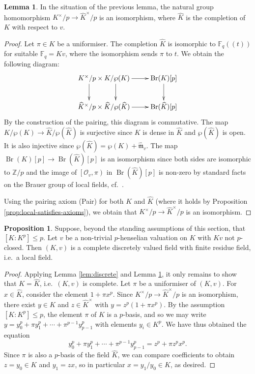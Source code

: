 \documentclass[a4paper, british, oneside]{amsart}
\newcommand{\Z}{\mathbb{Z}}
\newcommand{\F}{\mathbb{F}}
\DeclareMathOperator{\Br}{Br}
\newcommand{\pow}[1]{(\!(#1)\!)}
\newcommand{\pair}[2]{\left[{#1}, {#2}\right)}
\theoremstyle{definition}
\newtheorem{lemma}[theorem]{Lemma}
\newtheorem{proposition}[theorem]{Proposition}
\theoremstyle{remark}
\begin{document}
\begin{lemma}\label{lem:p-th-power-classes-isom}
  In the situation of the previous lemma,
  the natural group homomorphism $K^\times/p \to \widehat{K}^\times/p$ is an isomorphism,
  where $\widehat{K}$ is the completion of $K$ with respect to $v$.
\end{lemma}
\begin{proof}
  Let $\pi \in K$ be a uniformiser.
  The completion $\widehat{K}$ is isomorphic to $\F_q\pow{t}$ for suitable $\F_q = Kv$,
  where the isomorphism sends $\pi$ to $t$.
  We obtain the following diagram:
  \[ \xymatrix{
      K^\times/p  \times K/\wp(K) \ar@<-5ex>[d] \ar@<4ex>[d] \ar[r] & \Br(K)[p] \ar[d] \\
      \widehat{K}^\times/p \times \widehat{K}/\wp(\widehat{K}) \ar[r] & \Br(\widehat{K})[p]
    }\]
  By the construction of the pairing, this diagram is commutative.
  The map $K/\wp(K) \to \widehat{K}/\wp(\widehat{K})$ is surjective since $K$ is dense in $\widehat{K}$ and $\wp(\widehat{K})$ is open.
  It is also injective since $\wp(\widehat{K}) = \wp(K) + \widehat{\mathfrak{m}}_v$.
  The map $\Br(K)[p] \to \Br(\widehat{K})[p]$ is an isomorphism
  since both sides are isomorphic to $\Z/p$
  and the image of $\pair{\mathcal{O}_v}{\pi}$ in $\Br(\widehat{K})[p]$ is non-zero
  by standard facts on the Brauer group of local fields, cf.\ \cite[Remark 6.3.6]{GilleSzamuely_2nd}.

  Using the pairing axiom (Pair) for both $K$ and $\widehat{K}$
  (where it holds by Proposition \ref{prop:local-satisfies-axioms}),
  we obtain that $K^\times/p \to \widehat{K}^\times/p$ is an isomorphism.
\end{proof}

\begin{proposition}\label{prop:field-is-local}
  Suppose, beyond the standing assumptions of this section, that $[K : K^p] \leq p$.
  Let $v$ be a non-trivial $p$-henselian valuation on $K$ with $Kv$ not $p$-closed.
  Then $(K, v)$ is a complete discretely valued field with finite residue field, i.e.\ a local field.
\end{proposition}
\begin{proof}
  Applying Lemma \ref{lem:discrete} and Lemma \ref{lem:p-th-power-classes-isom},
  it only remains to show that $K = \widehat{K}$, i.e.\ $(K,v)$ is complete.
  Let $\pi$ be a uniformiser of $(K,v)$.
  For $x \in \widehat{K}$, consider the element $1 + \pi x^p$.
  Since $K^\times/p \to \widehat{K}^\times/p$ is an isomorphism, there exist $y \in K$ and $z \in \widehat{K}^\times$ with $y = z^p(1 + \pi x^p)$.
  By the assumption $[K : K^p] \leq p$, the element $\pi$ of $K$ is a $p$-basis, and so we may write $y = y_0^p + \pi y_1^p + \dotsb + \pi^{p-1} y_{p-1}^p$ with elements $y_i \in K^p$.
  We have thus obtained the equation
  \[ y_0^p + \pi y_1^p + \dotsb + \pi^{p-1} y_{p-1}^p = z^p + \pi z^p x^p .\]
  Since $\pi$ is also a $p$-basis of the field $\widehat{K}$, we can compare coefficients to obtain $z = y_0 \in K$ and $y_1 = zx$, so in particular $x = y_1/y_0 \in K$, as desired.  
\end{proof}
\end{document}
